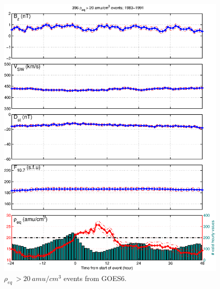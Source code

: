 \documentclass[10pt,twocolumn]{article}
\newcommand{\req}{\ensuremath{\rho_{eq}}}
\begin{document}
\begin{figure}[htp!]
	\centering
	\includegraphics[scale=0.40]{paperfigures/stormavs-mass-gt20-GOES6.eps}
\caption{$\req\ > 20~ amu/cm^3$ events from GOES6.}
\label{MassStormsGT20Figure}
\end{figure}
\end{document}
